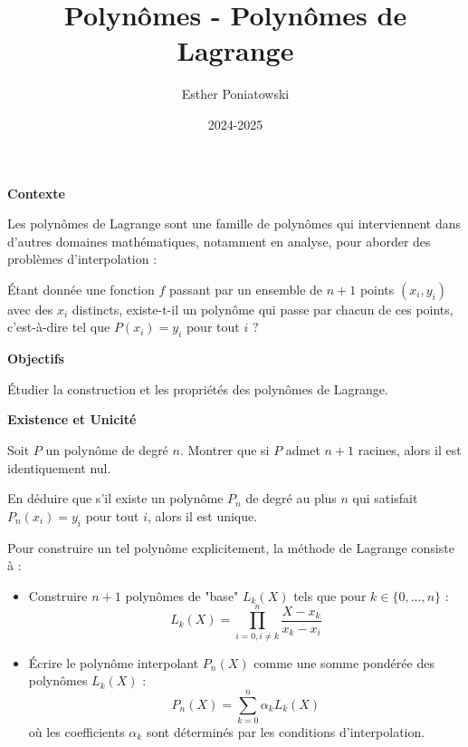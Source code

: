 \documentclass[10pt,a4paper]{article}
\title{Polynômes - Polynômes de Lagrange}
\author{Esther Poniatowski}
\date{2024-2025}
\begin{document}

\bigskip
\textbf{Contexte}

Les polynômes de Lagrange sont une famille de polynômes qui interviennent dans d'autres domaines
mathématiques, notamment en analyse, pour aborder des problèmes d'interpolation :

Étant donnée une fonction $f$ passant par un ensemble de $n+1$ points $ (x_i, y_i) $ avec des $x_i$
distincts, existe-t-il un polynôme qui passe par chacun de ces points, c'est-à-dire tel que $P(x_i)
= y_i$ pour tout $i$ ?


\bigskip
\textbf{Objectifs}

Étudier la construction et les propriétés des polynômes de Lagrange.

\bigskip
\textbf{Existence et Unicité}


\q Soit $P$ un polynôme de degré $n$. Montrer que si $P$ admet $n+1$ racines, alors il est
identiquement nul.

\q En déduire que s'il existe un polynôme $P_n$ de degré au plus $n$ qui satisfait $P_n(x_i) = y_i$
pour tout $i$, alors il est unique.

\bigskip

Pour construire un tel polynôme explicitement, la méthode de Lagrange consiste à :
\begin{itemize}
   \item Construire $n + 1$ polynômes de "base" \( L_k(X) \) tels que pour $k \in \{0, ..., n\}$ :
   $$L_k(X) = \prod_{i=0, i\neq k}^n \frac{X-x_k}{x_k-x_i}$$
   \item Écrire le polynôme interpolant \( P_n(X) \) comme une somme pondérée des polynômes \(
   L_k(X) \) :
   $$P_n(X) = \sum_{k=0}^n \alpha_k L_k(X)$$
   où les coefficients \( \alpha_k \) sont déterminés par les conditions d'interpolation.
\end{itemize}
\end{document}
